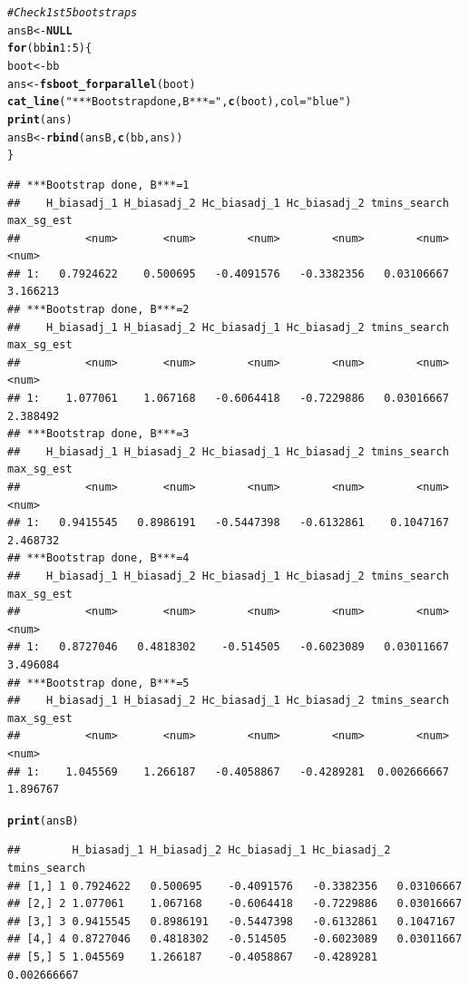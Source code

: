 \documentclass[12pt]{article}
\makeatletter
\newcommand{\hlnum}[1]{\textcolor[rgb]{0.686,0.059,0.569}{#1}}%
\newcommand{\hlstr}[1]{\textcolor[rgb]{0.192,0.494,0.8}{#1}}%
\newcommand{\hlcom}[1]{\textcolor[rgb]{0.678,0.584,0.686}{\textit{#1}}}%
\newcommand{\hlopt}[1]{\textcolor[rgb]{0,0,0}{#1}}%
\newcommand{\hlstd}[1]{\textcolor[rgb]{0.345,0.345,0.345}{#1}}%
\newcommand{\hlkwa}[1]{\textcolor[rgb]{0.161,0.373,0.58}{\textbf{#1}}}%
\newcommand{\hlkwb}[1]{\textcolor[rgb]{0.69,0.353,0.396}{#1}}%
\newcommand{\hlkwc}[1]{\textcolor[rgb]{0.333,0.667,0.333}{#1}}%
\newcommand{\hlkwd}[1]{\textcolor[rgb]{0.737,0.353,0.396}{\textbf{#1}}}%
\newenvironment{kframe}{%
 \def\at@end@of@kframe{}%
 \ifinner\ifhmode%
  \def\at@end@of@kframe{\end{minipage}}%
  \begin{minipage}{\columnwidth}%
 \fi\fi%
 \def\FrameCommand##1{\hskip\@totalleftmargin \hskip-\fboxsep
 \colorbox{shadecolor}{##1}\hskip-\fboxsep
     \hskip-\linewidth \hskip-\@totalleftmargin \hskip\columnwidth}%
 \MakeFramed {\advance\hsize-\width
   \@totalleftmargin\z@ \linewidth\hsize
   \@setminipage}}%
 {\par\unskip\endMakeFramed%
 \at@end@of@kframe}
\newenvironment{knitrout}{}{} %
\makeatother
\begin{document}
\begin{knitrout}
\begin{kframe}
\begin{alltt}
\hlcom{# Check 1st 5 bootstraps}
\hlstd{ansB} \hlkwb{<-} \hlkwa{NULL}
\hlkwa{for} \hlstd{(bb} \hlkwa{in} \hlnum{1}\hlopt{:}\hlnum{5}\hlstd{) \{}
    \hlstd{boot} \hlkwb{<-} \hlstd{bb}
    \hlstd{ans} \hlkwb{<-} \hlkwd{fsboot_forparallel}\hlstd{(boot)}
    \hlkwd{cat_line}\hlstd{(}\hlstr{"***Bootstrap done, B***="}\hlstd{,} \hlkwd{c}\hlstd{(boot),} \hlkwc{col} \hlstd{=} \hlstr{"blue"}\hlstd{)}
    \hlkwd{print}\hlstd{(ans)}
    \hlstd{ansB} \hlkwb{<-} \hlkwd{rbind}\hlstd{(ansB,} \hlkwd{c}\hlstd{(bb, ans))}
\hlstd{\}}
\end{alltt}
\begin{verbatim}
## ***Bootstrap done, B***=1
##    H_biasadj_1 H_biasadj_2 Hc_biasadj_1 Hc_biasadj_2 tmins_search max_sg_est
##          <num>       <num>        <num>        <num>        <num>      <num>
## 1:   0.7924622    0.500695   -0.4091576   -0.3382356   0.03106667   3.166213
## ***Bootstrap done, B***=2
##    H_biasadj_1 H_biasadj_2 Hc_biasadj_1 Hc_biasadj_2 tmins_search max_sg_est
##          <num>       <num>        <num>        <num>        <num>      <num>
## 1:    1.077061    1.067168   -0.6064418   -0.7229886   0.03016667   2.388492
## ***Bootstrap done, B***=3
##    H_biasadj_1 H_biasadj_2 Hc_biasadj_1 Hc_biasadj_2 tmins_search max_sg_est
##          <num>       <num>        <num>        <num>        <num>      <num>
## 1:   0.9415545   0.8986191   -0.5447398   -0.6132861    0.1047167   2.468732
## ***Bootstrap done, B***=4
##    H_biasadj_1 H_biasadj_2 Hc_biasadj_1 Hc_biasadj_2 tmins_search max_sg_est
##          <num>       <num>        <num>        <num>        <num>      <num>
## 1:   0.8727046   0.4818302    -0.514505   -0.6023089   0.03011667   3.496084
## ***Bootstrap done, B***=5
##    H_biasadj_1 H_biasadj_2 Hc_biasadj_1 Hc_biasadj_2 tmins_search max_sg_est
##          <num>       <num>        <num>        <num>        <num>      <num>
## 1:    1.045569    1.266187   -0.4058867   -0.4289281  0.002666667   1.896767
\end{verbatim}
\begin{alltt}
\hlkwd{print}\hlstd{(ansB)}
\end{alltt}
\begin{verbatim}
##        H_biasadj_1 H_biasadj_2 Hc_biasadj_1 Hc_biasadj_2 tmins_search
## [1,] 1 0.7924622   0.500695    -0.4091576   -0.3382356   0.03106667  
## [2,] 2 1.077061    1.067168    -0.6064418   -0.7229886   0.03016667  
## [3,] 3 0.9415545   0.8986191   -0.5447398   -0.6132861   0.1047167   
## [4,] 4 0.8727046   0.4818302   -0.514505    -0.6023089   0.03011667  
## [5,] 5 1.045569    1.266187    -0.4058867   -0.4289281   0.002666667 

\end{verbatim}
\end{kframe}
\end{knitrout}
\end{document}
